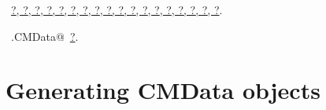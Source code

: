 \documentclass[reqno]{amsart}
\renewcommand{\NWlink}[2]{\hyperlink{#1}{#2}}
\begin{document}
\begin{flushleft}
\begin{list}{}{}
\mbox{}\verb@@{\NWsep}
\end{list}
\vspace{-1.5ex}
\footnotesize
\begin{list}{}{\setlength{\itemsep}{-\parsep}\setlength{\itemindent}{-\leftmargin}}
\item \NWtxtFileDefBy\ \NWlink{nuweb?}{?}\NWlink{nuweb?}{, ?}\NWlink{nuweb?}{, ?}\NWlink{nuweb?}{, ?}\NWlink{nuweb?}{, ?}\NWlink{nuweb?}{, ?}\NWlink{nuweb?}{, ?}\NWlink{nuweb?}{, ?}\NWlink{nuweb?}{, ?}\NWlink{nuweb?}{, ?}\NWlink{nuweb?}{, ?}\NWlink{nuweb?}{, ?}\NWlink{nuweb?}{, ?}\NWlink{nuweb?}{, ?}\NWlink{nuweb?}{, ?}\NWlink{nuweb?}{, ?}\NWlink{nuweb?}{, ?}\NWlink{nuweb?}{, ?}.
\item \NWtxtIdentsDefed\nobreak\  \verb@unwrap.CMData@\nobreak\ \NWlink{nuweb?}{?}.
\item{}
\end{list}
\vspace{4ex}
\end{flushleft}
\section{Generating CMData objects}
\end{document}
